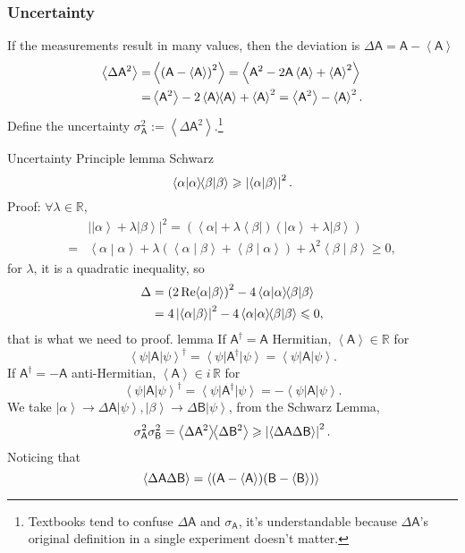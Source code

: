 \documentclass{article}
\def\sA{\mathsf A}\def\sB{\mathsf B}\def\sC{\mathsf C}\def\sX{\mathsf X}\def\sP{\mathsf P}\def\sH{\mathsf H}\def\sK{\mathsf K}\def\sL{\mathsf L}\def\sS{\mathsf S}\def\sM{\mathsf M}\def\sT{\mathsf T}
\newcommand{\ko}[1]{\hspace{-#1 pt}}%
\newcommand{\ave}[1]{\left\langle #1\right\rangle}%
\newcommand{\bra}[1]{\left\langle #1\right\vert}
\newcommand{\ket}[1]{\left\vert #1\right\rangle}
\newcommand{\brkt}[2]{\left\langle #1\middle\vert#2\right\rangle}
\begin{document}
\subsubsection{Uncertainty}
If the measurements result in many values, then the deviation is $\Delta\sA=\sA-\ave\sA$
\begin{align*}
	\ave{\Delta\sA^2}= & \ave{\left(\sA-\ave\sA\right)^2}=\ave{\sA^2-2\sA\ave\sA+\ave\sA^2} \\
	=                  & \ave{\sA^2}-2\ave\sA\ko3\ave\sA+\ave\sA^2=\ave{\sA^2}-\ave\sA^2.
\end{align*}
Define the uncertainty $\sigma_\sA^2:=\ave{\Delta\sA^2}$.\footnote{Textbooks tend to confuse $\Delta\sA$ and $\sigma_\sA$, it's understandable because $\Delta\sA$'s original definition in a single experiment doesn't matter.}
\begin{theorem}{Uncertainty Principle}{}
	lemma Schwarz
	\begin{equation}
		\brkt\alpha\alpha\ko3\brkt\beta\beta\geqslant\left|\brkt\alpha\beta\right|^2.
	\end{equation}
		Proof: $\forall\lambda\in\mathbb R,$
		\begin{align*}
			  & \left|\ket\alpha+\lambda\ket\beta\right|^2=(\bra\alpha+\lambda\bra\beta)(\ket\alpha+\lambda\ket\beta)        \\
			= & \brkt\alpha\alpha+\lambda\left(\brkt\alpha\beta+\brkt\beta\alpha\right)+\lambda^2\brkt\beta\beta\geqslant 0,
		\end{align*}
		for $\lambda$, it is a quadratic inequality, so
		\begin{align*}
			\Delta & =\left(2\,\text{Re}\ko2\brkt\alpha\beta\right)^2-4\brkt\alpha\alpha\ko3\brkt\beta\beta \\
			       & =4\left|\brkt\alpha\beta\right|^2-4\brkt\alpha\alpha\ko3\brkt\beta\beta\leqslant 0,
		\end{align*}
		that is what we need to proof.
	lemma
		If $\sA^\dagger=\sA$ Hermitian, $\ave\sA\in\mathbb R$ for
		$$\bra\psi\sA\ket\psi^\dagger=\bra\psi\sA^\dagger\ket\psi=\bra\psi\sA\ket\psi.$$
		If $\sA^\dagger=-\sA$ anti-Hermitian, $\ave\sA\in i\,\mathbb R$ for
		$$\bra\psi\sA\ket\psi^\dagger=\bra\psi\sA^\dagger\ket\psi=-\bra\psi\sA\ket\psi.$$
	We take $\ket\alpha\rightarrow\Delta\sA\ket\psi,\ket\beta\rightarrow\Delta\sB\ket\psi$, from the Schwarz Lemma,
	$$\sigma_\sA^2\sigma_\sB^2=\ave{\Delta\sA^2}\ko3\ave{\Delta\sB^2}\geqslant\left|\ave{\Delta\sA\Delta\sB}\right|^2.$$
	Noticing that
	$$\ave{\Delta\sA\Delta\sB}=\ave{(\sA-\ave\sA)(\sB-\ave\sB)}\\
$$
\end{theorem}
\end{document}
